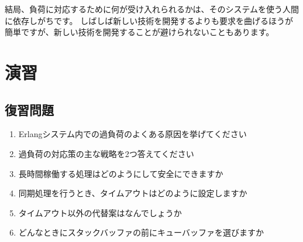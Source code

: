 結局、負荷に対応するために何が受け入れられるかは、そのシステムを使う人間に依存しがちです。
しばしば新しい技術を開発するよりも要求を曲げるほうが簡単ですが、新しい技術を開発することが避けられないこともあります。

\section{演習}

\subsection*{復習問題}

\begin{enumerate}
  \item Erlangシステム内での過負荷のよくある原因を挙げてください
  \item 過負荷の対応策の主な戦略を2つ答えてください
  \item 長時間稼働する処理はどのようにして安全にできますか
  \item 同期処理を行うとき、タイムアウトはどのように設定しますか
  \item タイムアウト以外の代替案はなんでしょうか
  \item どんなときにスタックバッファの前にキューバッファを選びますか
\end{enumerate}

